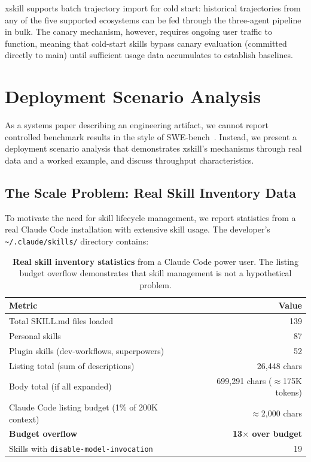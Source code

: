 \documentclass{article}
\begin{document}
xskill supports batch trajectory import for cold start: historical trajectories from any of the five supported ecosystems can be fed through the three-agent pipeline in bulk. The canary mechanism, however, requires ongoing user traffic to function, meaning that cold-start skills bypass canary evaluation (committed directly to main) until sufficient usage data accumulates to establish baselines.


\section{Deployment Scenario Analysis}
\label{sec:evaluation}

As a systems paper describing an engineering artifact, we cannot report controlled benchmark results in the style of SWE-bench~\citep{jimenez2024swebench}. Instead, we present a deployment scenario analysis that demonstrates xskill's mechanisms through real data and a worked example, and discuss throughput characteristics.

\subsection{The Scale Problem: Real Skill Inventory Data}

To motivate the need for skill lifecycle management, we report statistics from a real Claude Code installation with extensive skill usage. The developer's \texttt{\~{}/.claude/skills/} directory contains:

\begin{table}[h]
\centering
\caption{\textbf{Real skill inventory statistics} from a Claude Code power user. The listing budget overflow demonstrates that skill management is not a hypothetical problem.}
\label{tab:inventory}
\small
\begin{tabular}{@{}lr@{}}
\toprule
\textbf{Metric} & \textbf{Value} \\
\midrule
Total SKILL.md files loaded & 139 \\
\quad Personal skills & 87 \\
\quad Plugin skills (dev-workflows, superpowers) & 52 \\
Listing total (sum of descriptions) & 26,448 chars \\
Body total (if all expanded) & 699,291 chars ($\approx$175K tokens) \\
Claude Code listing budget (1\% of 200K context) & $\approx$2,000 chars \\
\textbf{Budget overflow} & \textbf{13$\times$ over budget} \\
Skills with \texttt{disable-model-invocation} & 19 \\
\bottomrule
\end{tabular}
\end{table}
\end{document}
